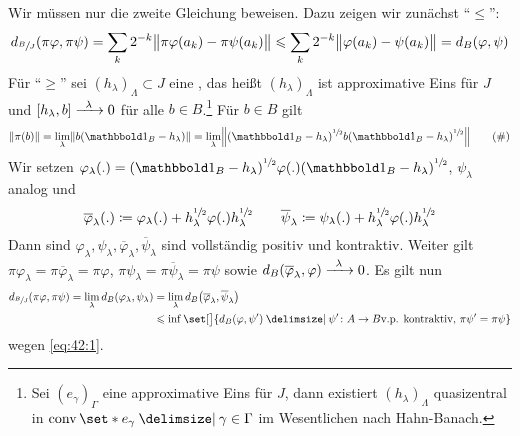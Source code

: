 \begin{beweis}
	Wir müssen nur die zweite Gleichung beweisen.
	Dazu zeigen wir zunächst \enquote{$\le$}: 
	\[
		d_{\sfrac{B}{J}} \enbrace*{\pi \varphi, \pi \psi} = \sum_{k} 2^{-k} \norm[\big]{\pi \varphi(a_k) - \pi \psi(a_k)} \le \sum_k 2^{-k} \norm[\big]{\varphi(a_k) - \psi(a_k)} = d_B(\varphi,\psi)
	\]
	Für \enquote{$\ge$} sei $(h_\lambda)_\Lambda \subset J$ eine , das heißt $(h_\lambda)_\Lambda$ ist approximative Eins für $J$ und $\benbrace*{h_\lambda,b} \grenzwIn{\lambda} 0$ für alle $b \in B$.\footnote{Sei $(e_\gamma)_\Gamma$ eine approximative Eins für $J$, dann existiert $(h_\lambda)_\Lambda$ quasizentral in $\conv\set*{e_\gamma \given \gamma \in  \Gamma}$ im Wesentlichen nach Hahn-Banach.}
	Für $b \in B$ gilt 
	\begin{equation}
		\norm*{\pi(b)} = \lim_\lambda \norm*{b(\ind_B - h_\lambda)} = \lim_\lambda \norm*{\enbrace*{\ind_B -h_\lambda}^{\sfrac{1}{2}} b \enbrace*{\ind_B - h_\lambda}^{\sfrac{1}{2}}} \label{eq:42:1} \tag{\#}
	\end{equation}
	Wir setzen $\varphi_\lambda(.) = \enbrace*{\ind_B - h_\lambda}^{\sfrac{1}{2}}\varphi(.) \enbrace*{\ind_B - h_\lambda}^{\sfrac{1}{2}}$, $\psi_\lambda$ analog und
	\[
		\overline{\varphi}_\lambda(.)  \coloneqq \varphi_\lambda(.) + h_\lambda^{\sfrac{1}{2}} \varphi(.) h_\lambda^{\sfrac{1}{2}} \qquad \overline{\psi}_\lambda \coloneqq \psi_\lambda(.) + h_\lambda^{\sfrac{1}{2}} \varphi(.) h_\lambda^{\sfrac{1}{2}}
	\]
	Dann sind $\varphi_\lambda, \psi_\lambda, \overline{\varphi}_\lambda, \overline{\psi}_\lambda$ sind vollständig positiv und kontraktiv.
	Weiter gilt $\pi \varphi_\lambda= \pi \overline{\varphi}_\lambda = \pi \varphi$, $\pi \psi_\lambda = \pi \overline{\psi}_\lambda = \pi \psi$ sowie $d_B(\overline{\varphi}_\lambda,\varphi) \grenzw{\lambda} 0$.
	Es gilt nun
	\begin{align}
		d_{\sfrac{B}{J}} \enbrace*{\pi \varphi, \pi \psi} = \lim_\lambda d_B(\varphi_\lambda,\psi_\lambda) &= \lim_\lambda d_B \enbrace*{\overline{\varphi}_\lambda, \overline{\psi}_\lambda} \\
		&\le \inf \set[\big]{d_B(\varphi,\psi') \given \psi' \colon A \to B \text{v.p. kontraktiv, } \pi \psi' = \pi \psi}
	\end{align}
	wegen \eqref{eq:42:1}.
\end{beweis}

